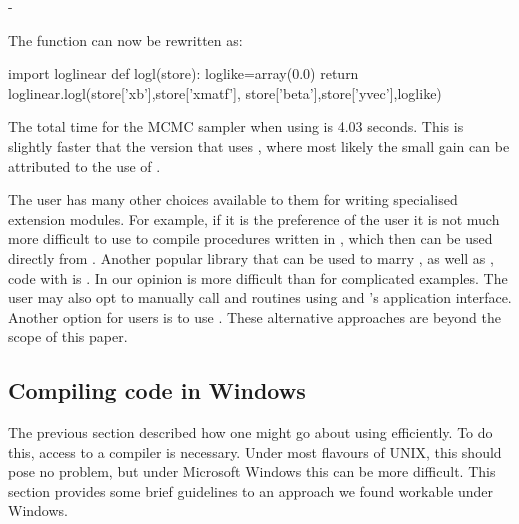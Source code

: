 -\documentclass[article]{jss}
\begin{document}
The function  can now be rewritten as:

\begin{Code}
import loglinear
def logl(store):
	loglike=array(0.0)     
	return loglinear.logl(store['xb'],store['xmatf'], 
                  store['beta'],store['yvec'],loglike)
\end{Code}

The total time for the MCMC sampler when using  is 4.03 seconds.
This is slightly faster that the version that uses , where most
likely the small gain can be attributed to the use of .

The user has many other choices available to them for writing
specialised extension modules. For example, if it is the preference of
the user it is not much more difficult to use  to compile
procedures written in , which then can be used directly
from . Another popular library that can be used to
marry , as well as , code with
 is . In our opinion  is more
difficult than  for complicated examples. The user may also
opt to manually call  and  routines using
 and 's  application
interface. Another option for  users is to use
 . These alternative approaches are beyond
the scope of this paper.


\subsection{Compiling code in Windows}
\label{CompilingWindows}

The previous section described how one might go about using
 efficiently. To do this, access to a compiler is
necessary. Under most flavours of UNIX, this should pose no problem,
but under Microsoft Windows this can be more difficult. This section
provides some brief guidelines to an approach we found workable under
Windows.
\end{document}
